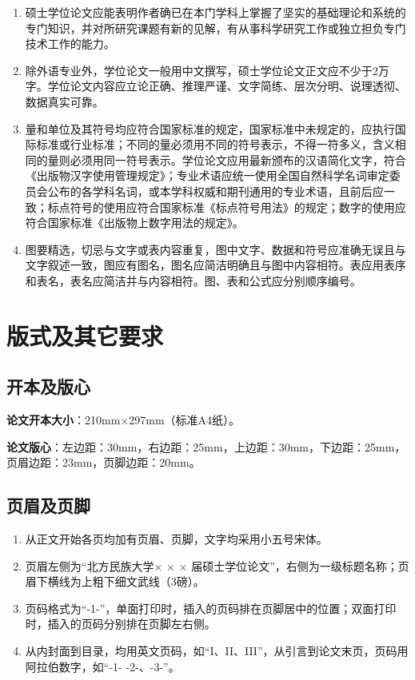 \begin{enumerate}[label=\arabic*)]
	\item 硕士学位论文应能表明作者确已在本门学科上掌握了坚实的基础理论和系统的专门知识，并对所研究课题有新的见解，有从事科学研究工作或独立担负专门技术工作的能力。
	
	\item 除外语专业外，学位论文一般用中文撰写，硕士学位论文正文应不少于2万字。学位论文内容应立论正确、推理严谨、文字简练、层次分明、说理透彻、数据真实可靠。
	
	\item 量和单位及其符号均应符合国家标准的规定，国家标准中未规定的，应执行国际标准或行业标准；不同的量必须用不同的符号表示，不得一符多义，含义相同的量则必须用同一符号表示。学位论文应用最新颁布的汉语简化文字，符合《出版物汉字使用管理规定》；专业术语应统一使用全国自然科学名词审定委员会公布的各学科名词，或本学科权威和期刊通用的专业术语，且前后应一致；标点符号的使用应符合国家标准《标点符号用法》的规定；数字的使用应符合国家标准《出版物上数字用法的规定》。
	
	\item 图要精选，切忌与文字或表内容重复，图中文字、数据和符号应准确无误且与文字叙述一致，图应有图名，图名应简洁明确且与图中内容相符。表应用表序和表名，表名应简洁并与内容相符。图、表和公式应分别顺序编号。
\end{enumerate}


\section{版式及其它要求}


\subsection{开本及版心}
{\bfseries 论文开本大小}：210mm$\times$297mm（标准A4纸）。

{\bfseries 论文版心}：左边距：30mm，右边距：25mm，上边距：30mm，下边距：25mm，页眉边距：23mm，页脚边距：20mm。
\subsection{页眉及页脚}
\label{sec:error1}
\begin{enumerate}[label=\arabic*)]
	\item 从正文开始各页均加有页眉、页脚，文字均采用小五号宋体。
	
	\item 页眉左侧为“北方民族大学$\times$ $\times$ $\times$ 届硕士学位论文”，右侧为一级标题名称；页眉下横线为上粗下细文武线（3磅）。
	
	\item 页码格式为“-1-”，单面打印时，插入的页码排在页脚居中的位置；双面打印时，插入的页码分别排在页脚左右侧。
	
	\item 从内封面到目录，均用英文页码，如“I、II、III”，从引言到论文末页，页码用阿拉伯数字，如“-1- -2-、-3-”。
\end{enumerate}

